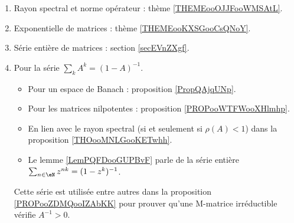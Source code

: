       \label{THEMEooPQKDooTAVKFH}

\begin{enumerate}
    \item
        Rayon spectral et norme opérateur : thème \ref{THEMEooOJJFooWMSAtL}.
    \item
        Exponentielle de matrices : thème \ref{THEMEooKXSGooCsQNoY}.
    \item
        Série entière de matrices : section \ref{secEVnZXgf}.
    \item
        Pour la série \( \sum_kA^k=(1-A)^{-1}\).
        \begin{itemize}
            \item Pour un espace de Banach : proposition \ref{PropQAjqUNp}.
            \item Pour les matrices nilpotentes : proposition \ref{PROPooWTFWooXHlmhp}.
            \item En lien avec le rayon spectral (si et seulement si \( \rho(A)<1\)) dans la proposition \ref{THOooMNLGooKETwhh}.
            \item Le lemme \ref{LemPQFDooGUPBvF} parle de la série entière \( \sum_{n\in \eN}z^{nk}=(1-z^k)^{-1}\).
        \end{itemize}
        Cette série est utilisée entre autres dans la proposition \ref{PROPooZDMQooIZAbKK} pour prouver qu'une M-matrice irréductible vérifie \( A^{-1}>0\).
\end{enumerate}
